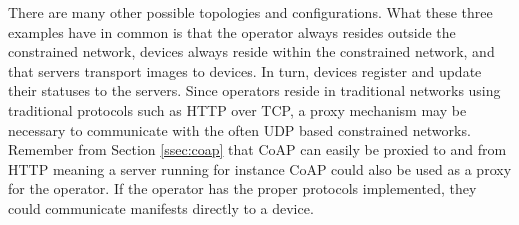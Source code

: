 \documentclass[0-thesis.tex]{subfiles}
\begin{document}
There are many other possible topologies and configurations. What these three examples
have in common is that the operator always resides outside the constrained network,
devices always reside within the constrained network, and that servers transport images to
devices. In turn, devices register and update their statuses to the servers. Since
operators reside in traditional networks using traditional protocols such as HTTP over
TCP, a proxy mechanism may be necessary to communicate with the often UDP based
constrained networks. Remember from Section \ref{ssec:coap} that CoAP can easily be
proxied to and from HTTP meaning a server running for instance CoAP could also be used as
a proxy for the operator. If the operator has the proper protocols implemented, they could
communicate manifests directly to a device.
\end{document}
